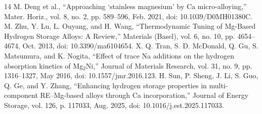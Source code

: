 \documentclass[preprint,12pt]{elsarticle}
\begin{document}
\begin{thebibliography}{14}
 M. Deng et al., “Approaching ‘stainless magnesium’ by Ca micro-alloying,” Mater. Horiz., vol. 8, no. 2, pp. 589–596, Feb. 2021, doi: 10.1039/D0MH01380C.
 M. Zhu, Y. Lu, L. Ouyang, and H. Wang, “Thermodynamic Tuning of Mg-Based Hydrogen Storage Alloys: A Review,” Materials (Basel), vol. 6, no. 10, pp. 4654–4674, Oct. 2013, doi: 10.3390/ma6104654.
 X. Q. Tran, S. D. McDonald, Q. Gu, S. Matsumura, and K. Nogita, “Effect of trace Na additions on the hydrogen absorption kinetics of Mg$_2$Ni,” Journal of Materials Research, vol. 31, no. 9, pp. 1316–1327, May 2016, doi: 10.1557/jmr.2016.123.
 H. Sun, P. Sheng, J. Li, S. Guo, Q. Ge, and Y. Zhang, “Enhancing hydrogen storage properties in multi-component RE–Mg-based alloys through Ca incorporation,” Journal of Energy Storage, vol. 126, p. 117033, Aug. 2025, doi: 10.1016/j.est.2025.117033.
\end{thebibliography}
\end{document}
